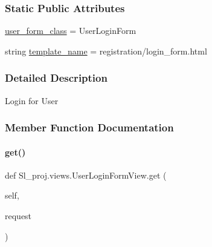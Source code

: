 \subsubsection*{Static Public Attributes}
\begin{DoxyCompactItemize}
\item 
\hyperlink{classSl__proj_1_1views_1_1UserLoginFormView_a1d8d4746b7c6c86eb9eac4efdcede8db}{user\+\_\+form\+\_\+class} = User\+Login\+Form
\item 
string \hyperlink{classSl__proj_1_1views_1_1UserLoginFormView_a6238cdbe933e7dacd7dbfbc3f17e75bc}{template\+\_\+name} = \textquotesingle{}registration/login\+\_\+form.\+html\textquotesingle{}
\end{DoxyCompactItemize}


\subsubsection{Detailed Description}
Login for User 

\subsubsection{Member Function Documentation}
\mbox{\label{classSl__proj_1_1views_1_1UserLoginFormView_af24823ced14500cd159aa0c7a2863eac}} 
\paragraph{\texorpdfstring{get()}{get()}}
{\footnotesize\ttfamily def Sl\+\_\+proj.\+views.\+User\+Login\+Form\+View.\+get (\begin{DoxyParamCaption}\item[{}]{self,  }\item[{}]{request }\end{DoxyParamCaption})}

\mbox{\label{classSl__proj_1_1views_1_1UserLoginFormView_ae4839a4a65fe7a93bdcf1f71db891297}} 
